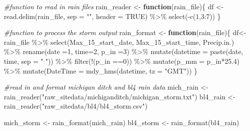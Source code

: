 \documentclass[
]{book}
\newenvironment{Shaded}{\begin{snugshade}}{\end{snugshade}}
\newcommand{\AttributeTok}[1]{\textcolor[rgb]{0.77,0.63,0.00}{#1}}
\newcommand{\CommentTok}[1]{\textcolor[rgb]{0.56,0.35,0.01}{\textit{#1}}}
\newcommand{\ConstantTok}[1]{\textcolor[rgb]{0.00,0.00,0.00}{#1}}
\newcommand{\ControlFlowTok}[1]{\textcolor[rgb]{0.13,0.29,0.53}{\textbf{#1}}}
\newcommand{\DecValTok}[1]{\textcolor[rgb]{0.00,0.00,0.81}{#1}}
\newcommand{\FloatTok}[1]{\textcolor[rgb]{0.00,0.00,0.81}{#1}}
\newcommand{\FunctionTok}[1]{\textcolor[rgb]{0.00,0.00,0.00}{#1}}
\newcommand{\NormalTok}[1]{#1}
\newcommand{\OtherTok}[1]{\textcolor[rgb]{0.56,0.35,0.01}{#1}}
\newcommand{\SpecialCharTok}[1]{\textcolor[rgb]{0.00,0.00,0.00}{#1}}
\newcommand{\StringTok}[1]{\textcolor[rgb]{0.31,0.60,0.02}{#1}}
\begin{document}
\begin{Shaded}
\begin{Highlighting}[]
\CommentTok{\#function to read in rain files}
\NormalTok{rain\_reader }\OtherTok{\textless{}{-}} \ControlFlowTok{function}\NormalTok{(rain\_file)\{}
\NormalTok{  df }\OtherTok{\textless{}{-}}\FunctionTok{read.delim}\NormalTok{(rain\_file, }\AttributeTok{sep =} \StringTok{""}\NormalTok{, }\AttributeTok{header =} \ConstantTok{TRUE}\NormalTok{) }\SpecialCharTok{\%\textgreater{}\%}
  \FunctionTok{select}\NormalTok{(}\SpecialCharTok{{-}}\FunctionTok{c}\NormalTok{(}\DecValTok{1}\NormalTok{,}\DecValTok{3}\SpecialCharTok{:}\DecValTok{7}\NormalTok{))}
\NormalTok{\}}

\CommentTok{\#function to process the storm output }
\NormalTok{rain\_format }\OtherTok{\textless{}{-}} \ControlFlowTok{function}\NormalTok{(rain\_file)\{}
\NormalTok{  df}\OtherTok{\textless{}{-}}\NormalTok{ rain\_file }\SpecialCharTok{\%\textgreater{}\%}
  \FunctionTok{select}\NormalTok{(Max\_15\_start\_date, Max\_15\_start\_time, Precip.in.) }\SpecialCharTok{\%\textgreater{}\%}
  \FunctionTok{rename}\NormalTok{(}\AttributeTok{date =}\DecValTok{1}\NormalTok{, }\AttributeTok{time=}\DecValTok{2}\NormalTok{, }\AttributeTok{p\_in =}\DecValTok{3}\NormalTok{) }\SpecialCharTok{\%\textgreater{}\%}
  \FunctionTok{mutate}\NormalTok{(}\AttributeTok{datetime =} \FunctionTok{paste}\NormalTok{(date, time, }\AttributeTok{sep =} \StringTok{" "}\NormalTok{)) }\SpecialCharTok{\%\textgreater{}\%}
  \FunctionTok{filter}\NormalTok{(}\SpecialCharTok{!}\NormalTok{(p\_in }\SpecialCharTok{==}\DecValTok{0}\NormalTok{)) }\SpecialCharTok{\%\textgreater{}\%}
  \FunctionTok{mutate}\NormalTok{(}\AttributeTok{p\_mm =}\NormalTok{ p\_in}\SpecialCharTok{*}\FloatTok{25.4}\NormalTok{) }\SpecialCharTok{\%\textgreater{}\%}
  \FunctionTok{mutate}\NormalTok{(}\AttributeTok{DateTime =} \FunctionTok{mdy\_hms}\NormalTok{(datetime, }\AttributeTok{tz =} \StringTok{"GMT"}\NormalTok{))  }
\NormalTok{\}}

\CommentTok{\#read in and format michigan ditch and bl4 rain data}
\NormalTok{mich\_rain }\OtherTok{\textless{}{-}} \FunctionTok{rain\_reader}\NormalTok{(}\StringTok{"raw\_sitedata/michiganditch/michigan\_storm.txt"}\NormalTok{)}
\NormalTok{bl4\_rain }\OtherTok{\textless{}{-}} \FunctionTok{rain\_reader}\NormalTok{(}\StringTok{"raw\_sitedata/bl4/bl4\_storm.csv"}\NormalTok{)}

\NormalTok{mich\_storm }\OtherTok{\textless{}{-}} \FunctionTok{rain\_format}\NormalTok{(mich\_rain)}
\NormalTok{bl4\_storm }\OtherTok{\textless{}{-}} \FunctionTok{rain\_format}\NormalTok{(bl4\_rain)}
\end{Highlighting}
\end{Shaded}
\end{document}
